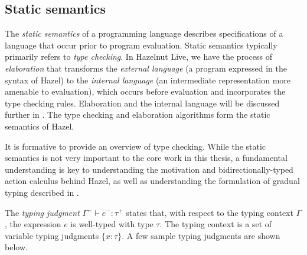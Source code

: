 
\subsection{Static semantics}
\label{sec:static-semantics}

The \textit{static semantics} of a programming language describes specifications of a language that occur prior to program evaluation. Static semantics typically primarily refers to \textit{type checking}. In Hazelnut Live, we have the process of \textit{elaboration} that transforms the \textit{external language} (a program expressed in the syntax of Hazel) to the \textit{internal language} (an intermediate representation more amenable to evaluation), which occurs before evaluation and incorporates the type checking rules. Elaboration and the internal language will be discussed further in . The type checking and elaboration algorithms form the static semantics of Hazel.

It is formative to provide an overview of type checking. While the static semantics is not very important to the core work in this thesis, a fundamental understanding is key to understanding the motivation and bidirectionally-typed action calculus behind Hazel, as well as understanding the formulation of gradual typing described in .

The \textit{typing judgment} $\Gamma^-\vdash e^-:\tau^+$ states that, with respect to the typing context $\Gamma$, the expression $e$ is well-typed with type $\tau$. The typing context is a set of variable typing judgments $\{x:\tau\}$. A few sample typing judgments are shown below.

\begin{singlespace}
\end{singlespace}

